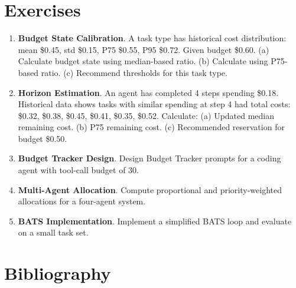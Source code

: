 \section*{Exercises}

\begin{enumerate}
\item \textbf{Budget State Calibration}. A task type has historical cost distribution: mean \$0.45, std \$0.15, P75 \$0.55, P95 \$0.72. Given budget \$0.60. (a) Calculate budget state using median-based ratio. (b) Calculate using P75-based ratio. (c) Recommend thresholds for this task type.
\item \textbf{Horizon Estimation}. An agent has completed 4 steps spending \$0.18. Historical data shows tasks with similar spending at step 4 had total costs: \$0.32, \$0.38, \$0.45, \$0.41, \$0.35, \$0.52. Calculate: (a) Updated median remaining cost. (b) P75 remaining cost. (c) Recommended reservation for budget \$0.50.
\item \textbf{Budget Tracker Design}. Design Budget Tracker prompts for a coding agent with tool-call budget of 30.
\item \textbf{Multi-Agent Allocation}. Compute proportional and priority-weighted allocations for a four-agent system.
\item \textbf{BATS Implementation}. Implement a simplified BATS loop and evaluate on a small task set.
\end{enumerate}

\section*{Bibliography}

